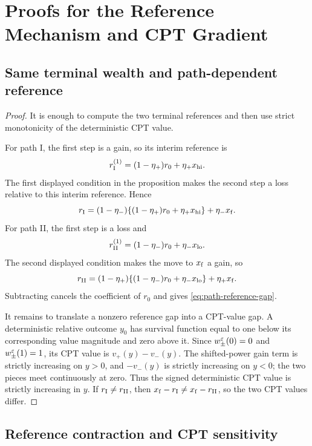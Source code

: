 \section{Proofs for the Reference Mechanism and CPT Gradient}\label{app:reference-gradient}

\subsection{Same terminal wealth and path-dependent reference}

\begin{proof}
It is enough to compute the two terminal references and then use strict monotonicity of the deterministic CPT value.

For path I, the first step is a gain, so its interim reference is
\[
 r_{\rm I}^{(1)}=(1-\eta_+)r_0+\eta_+x_{\rm hi}.
\]
The first displayed condition in the proposition makes the second step a loss relative to this interim reference.  Hence
\[
 r_{\rm I}=(1-\eta_-)\{(1-\eta_+)r_0+\eta_+x_{\rm hi}\}+\eta_-x_{\rm f}.
\]
For path II, the first step is a loss and
\[
 r_{\rm II}^{(1)}=(1-\eta_-)r_0+\eta_-x_{\rm lo}.
\]
The second displayed condition makes the move to $x_{\rm f}$ a gain, so
\[
 r_{\rm II}=(1-\eta_+)\{(1-\eta_-)r_0+\eta_-x_{\rm lo}\}+\eta_+x_{\rm f}.
\]
Subtracting cancels the coefficient of $r_0$ and gives \eqref{eq:path-reference-gap}.

It remains to translate a nonzero reference gap into a CPT-value gap.  A deterministic relative outcome $y_0$ has survival function equal to one below its corresponding value magnitude and zero above it.  Since $w_\pm^\varepsilon(0)=0$ and $w_\pm^\varepsilon(1)=1$, its CPT value is
$v_+(y)-v_-(y)$.  The shifted-power gain term is strictly increasing on $y>0$, and $-v_-(y)$ is strictly increasing on $y<0$; the two pieces meet continuously at zero.  Thus the signed deterministic CPT value is strictly increasing in $y$.  If $r_{\rm I}\ne r_{\rm II}$, then $x_{\rm f}-r_{\rm I}\ne x_{\rm f}-r_{\rm II}$, so the two CPT values differ.
\end{proof}

\subsection{Reference contraction and CPT sensitivity}

